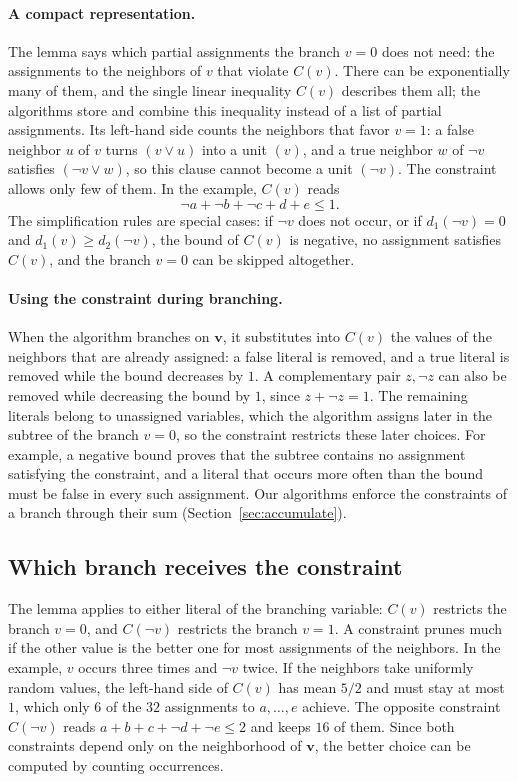 \documentclass[11pt,a4paper]{article}
\theoremstyle{definition}
\theoremstyle{remark}
\begin{document}
\paragraph{A compact representation.}
The lemma says which partial assignments the branch $v=0$ does not need:
the assignments to the neighbors of $v$ that violate $C(v)$. There can be
exponentially many of them, and the single linear inequality $C(v)$
describes them all; the algorithms store and combine this inequality
instead of a list of partial assignments. Its left-hand side counts the neighbors that favor
$v=1$: a false neighbor $u$ of $v$ turns $(v\vee u)$ into a unit $(v)$, and
a true neighbor $w$ of $\neg v$ satisfies $(\neg v\vee w)$, so this clause
cannot become a unit $(\neg v)$. The constraint allows only few of them. In
the example, $C(v)$ reads
\[
 \neg a+\neg b+\neg c+d+e\le1 .
\]
The simplification rules are special cases: if $\neg v$ does not occur, or
if $d_1(\neg v)=0$ and $d_1(v)\ge d_2(\neg v)$, the bound of $C(v)$ is
negative, no assignment satisfies $C(v)$, and the branch $v=0$ can be
skipped altogether.

\paragraph{Using the constraint during branching.}
When the algorithm branches on $\mathbf v$, it substitutes into $C(v)$ the
values of the neighbors that are already assigned: a false literal is
removed, and a true literal is removed while the bound decreases by $1$. A
complementary pair $z,\neg z$ can also be removed while decreasing the
bound by $1$, since $z+\neg z=1$. The remaining literals belong to
unassigned variables, which the algorithm assigns later in the subtree of
the branch $v=0$, so the constraint restricts these later choices. For
example, a negative bound proves that the subtree contains no assignment
satisfying the constraint, and a literal that occurs more often than the
bound must be false in every such assignment. Our algorithms enforce the
constraints of a branch through their sum (Section~\ref{sec:accumulate}).

\subsection{Which branch receives the constraint}\label{sec:preference}

The lemma applies to either literal of the branching variable: $C(v)$
restricts the branch $v=0$, and $C(\neg v)$ restricts the branch $v=1$. A
constraint prunes much if the other value is the better one for most
assignments of the neighbors. In the example, $v$ occurs three times and
$\neg v$ twice. If the neighbors take uniformly random values, the
left-hand side of $C(v)$ has mean $5/2$ and must stay at most $1$, which
only $6$ of the $32$ assignments to $a,\ldots,e$ achieve. The opposite
constraint $C(\neg v)$ reads $a+b+c+\neg d+\neg e\le2$ and keeps $16$ of
them. Since both constraints depend only on the neighborhood of
$\mathbf v$, the better choice can be computed by counting occurrences.
\end{document}

